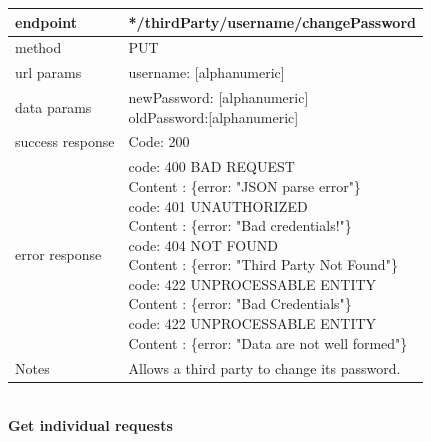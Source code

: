 \begin{legal}
\begin{legal}
\begin{itemize}
							\begin{tabularx}{\linewidth}{| l| l }
								\hline
								endpoint & */thirdParty/{username}/changePassword \\
								\hline
								method & PUT \\
								\hline
								url params & 
								\parbox{0.7\textwidth}{
									\bigskip
									username: [alphanumeric]
									\bigskip
								}\\
								\hline
								data params & 
								\parbox{0.7\textwidth}{
									\bigskip
									newPassword: [alphanumeric]\\
									oldPassword:[alphanumeric]
									\bigskip
								} \\
								\hline
								success response &
								\parbox{0.7\textwidth}{
									\bigskip
									Code: 200
									\bigskip
								} \\
								\hline
								error response &
								\parbox{0.7\textwidth}{
									\bigskip
									code: 400 BAD REQUEST \\
									Content : \{error: "JSON parse error"\}\\
									code: 401 UNAUTHORIZED \\
									Content : \{error: "Bad credentials!"\}\\
									code: 404 NOT FOUND \\
									Content : \{error: "Third Party Not Found"\}\\
									code: 422 UNPROCESSABLE ENTITY\\
									Content : \{error: "Bad Credentials"\}\\
									code: 422 UNPROCESSABLE ENTITY\\
									Content : \{error: "Data are not well formed"\}
									\bigskip
								} \\
								\hline
								Notes & \parbox{0.7\textwidth}{
									\bigskip
									Allows a third party to change its password.
									\bigskip
								} \\
								\hline
							\end{tabularx}\\
							\newpage
							\textbf{Get individual requests} \\
			

\end{itemize}
\end{legal}
\end{legal}
